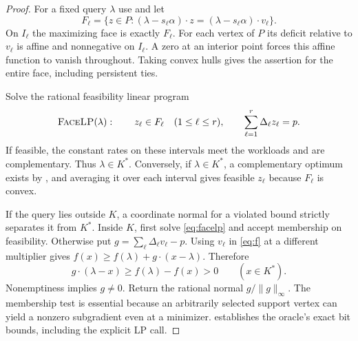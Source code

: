 \begin{proof}
For a fixed query $\lambda$ use  and let
\[
 F_\ell=\{z\in P:(\lambda-s_\ell\alpha)\cdot z
                    =(\lambda-s_\ell\alpha)\cdot v_\ell\}.
\]
On $I_\ell$ the maximizing face is exactly $F_\ell$. For each vertex of $P$ its deficit relative to $v_\ell$ is affine and nonnegative on $I_\ell$. A zero at an interior point forces this affine function to vanish throughout. Taking convex hulls gives the assertion for the entire face, including persistent ties.

Solve the rational feasibility linear program
\begin{equation}\label{eq:facelp}
 \textsc{FaceLP}(\lambda):\qquad
 z_\ell\in F_\ell\quad(1\leq\ell\leq r),\qquad
 \sum_{\ell=1}^r \Delta_\ell z_\ell=p .
\end{equation}
If feasible, the constant rates on these intervals meet the workloads and are complementary. Thus $\lambda\in K^*$. Conversely, if $\lambda\in K^*$, a complementary optimum exists by , and averaging it over each interval gives feasible $z_\ell$ because $F_\ell$ is convex.

If the query lies outside $K$, a coordinate normal for a violated bound strictly separates it from $K^*$. Inside $K$, first solve \eqref{eq:facelp} and accept membership on feasibility. Otherwise put $g=\sum_\ell\Delta_\ell v_\ell-p$. Using $v_\ell$ in \eqref{eq:f} at a different multiplier gives $f(x)\geq f(\lambda)+g\cdot(x-\lambda)$. Therefore
\[
 g\cdot(\lambda-x)\geq f(\lambda)-f(x)>0\qquad(x\in K^*).
\]
Nonemptiness implies $g\ne0$. Return the rational normal $g/\|g\|_\infty$. The membership test is essential because an arbitrarily selected support vertex can yield a nonzero subgradient even at a minimizer.  establishes the oracle's exact bit bounds, including the explicit LP call.
\end{proof}


